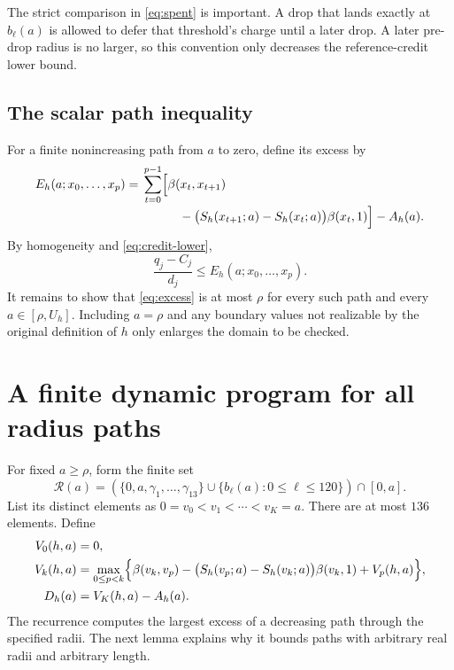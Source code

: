 \documentclass[11pt]{article}
\theoremstyle{definition}
\theoremstyle{remark}
\newcommand{\radset}{\mathcal R}
\begin{document}
The strict comparison in \eqref{eq:spent} is important. A drop that lands
exactly at $b_\ell(a)$ is allowed to defer that threshold's charge until a
later drop. A later pre-drop radius is no larger, so this convention only
decreases the reference-credit lower bound.

\subsection{The scalar path inequality}

For a finite nonincreasing path from $a$ to zero, define its excess by
\begin{equation}\label{eq:excess}
\begin{split}
  E_h(a;x_0,\ldots,x_p)
   ={}&\sum_{t=0}^{p-1}\Bigl[
      \beta(x_t,x_{t+1})\\[-2pt]
      &\hspace{3em}
      -\bigl(S_h(x_{t+1};a)-S_h(x_t;a)\bigr)\beta(x_t,1)
     \Bigr]-A_h(a).
\end{split}
\end{equation}
By homogeneity and \eqref{eq:credit-lower},
\begin{equation}\label{eq:row-excess-reduction}
  \frac{q_j-C_j}{d_j}\le E_h(a;x_0,\ldots,x_p).
\end{equation}
It remains to show that \eqref{eq:excess} is at most $\rho$ for every such
path and every $a\in[\rho,U_h]$. Including $a=\rho$ and any boundary values
not realizable by the original definition of $h$ only enlarges the domain
to be checked.

\section{A finite dynamic program for all radius paths}\label{sec:paths}

For fixed $a\ge\rho$, form the finite set
\begin{equation}\label{eq:radius-set}
  \radset(a)=
    \left(\{0,a,\gamma_1,\ldots,\gamma_{13}\}
       \cup\{b_\ell(a):0\le\ell\le120\}\right)\cap[0,a].
\end{equation}
List its distinct elements as
$0=v_0<v_1<\cdots<v_K=a$.
There are at most $136$ elements. Define
\begin{align}
  V_0(h,a)&=0,\notag\\
  V_k(h,a)
   &=\max_{0\le p<k}\Bigl\{
       \beta(v_k,v_p)
       -\bigl(S_h(v_p;a)-S_h(v_k;a)\bigr)\beta(v_k,1)
       +V_p(h,a)
     \Bigr\},\label{eq:dp}\\
  D_h(a)&=V_K(h,a)-A_h(a).\label{eq:D}
\end{align}
The recurrence computes the largest excess of a decreasing path through the
specified radii. The next lemma explains why it bounds paths with arbitrary
real radii and arbitrary length.
\end{document}
